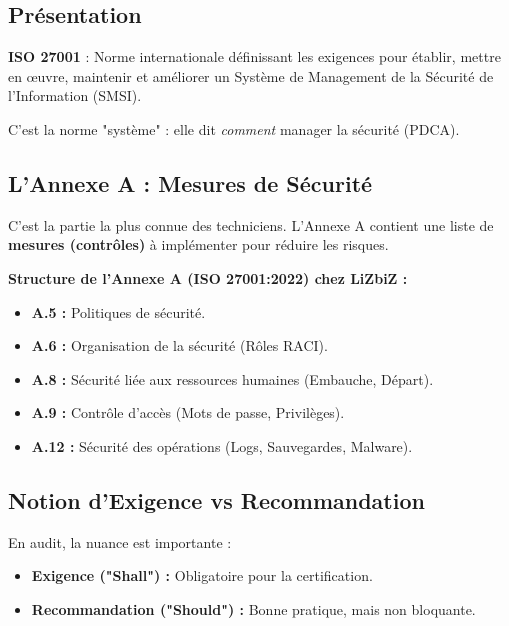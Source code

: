 \subsection{Présentation}

\begin{boxdef}
\textbf{ISO 27001} : Norme internationale définissant les exigences pour établir, mettre en œuvre, maintenir et améliorer un Système de Management de la Sécurité de l'Information (SMSI).
\end{boxdef}

C'est la norme "système" : elle dit \textit{comment} manager la sécurité (PDCA).

\subsection{L'Annexe A : Mesures de Sécurité}

C'est la partie la plus connue des techniciens. L'Annexe A contient une liste de \textbf{mesures (contrôles)} à implémenter pour réduire les risques.

\begin{boxlizbiz}
\textbf{Structure de l'Annexe A (ISO 27001:2022) chez LiZbiZ :}
\begin{itemize}
    \item \textbf{A.5 :} Politiques de sécurité.
    \item \textbf{A.6 :} Organisation de la sécurité (Rôles RACI).
    \item \textbf{A.8 :} Sécurité liée aux ressources humaines (Embauche, Départ).
    \item \textbf{A.9 :} Contrôle d'accès (Mots de passe, Privilèges).
    \item \textbf{A.12 :} Sécurité des opérations (Logs, Sauvegardes, Malware).
\end{itemize}
\end{boxlizbiz}

\subsection{Notion d'Exigence vs Recommandation}

En audit, la nuance est importante :
\begin{itemize}
    \item \textbf{Exigence ("Shall") :} Obligatoire pour la certification.
    \item \textbf{Recommandation ("Should") :} Bonne pratique, mais non bloquante.
\end{itemize}

